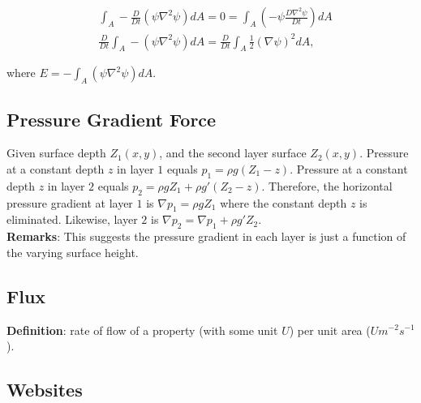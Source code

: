 \begin{equation}
   \begin{aligned}
      & \int_A -\frac{D}{Dt} (\psi \nabla^2\psi) dA= 0= \int_A \left( -\psi \frac{D\nabla^2\psi}{Dt} \right) dA \\
      & \frac{D}{Dt} \int_A -(\psi \nabla^2\psi) dA= \frac{D}{Dt} \int_A \frac{1}{2} (\nabla\psi)^2 dA,
   \end{aligned}
\end{equation}

where $E= -\int_A (\psi \nabla^2\psi) dA$.



\subsection{Pressure Gradient Force}
Given surface depth $Z_1(x,y)$, and the second layer surface $Z_2(x,y)$.
Pressure at a constant depth $z$ in layer $1$ equals $p_1= \rho g (Z_1- z)$.
Pressure at a constant depth $z$ in layer $2$ equals $p_2= \rho g Z_1 + \rho g' (Z_2- z)$.
Therefore, the horizontal pressure gradient at layer $1$ is $\nabla p_1= \rho g Z_1$ where the constant depth $z$ is eliminated.
Likewise, layer $2$ is $\nabla p_2= \nabla p_1 + \rho g' Z_2$. \\

{\bf Remarks}: This suggests the pressure gradient in each layer is just a function of the varying surface height.


\subsection{Flux}
{\bf Definition}: rate of flow of a property (with some unit $U$) per unit area ($U m^{-2}s^{-1}$).

%
\subsection{Websites}

